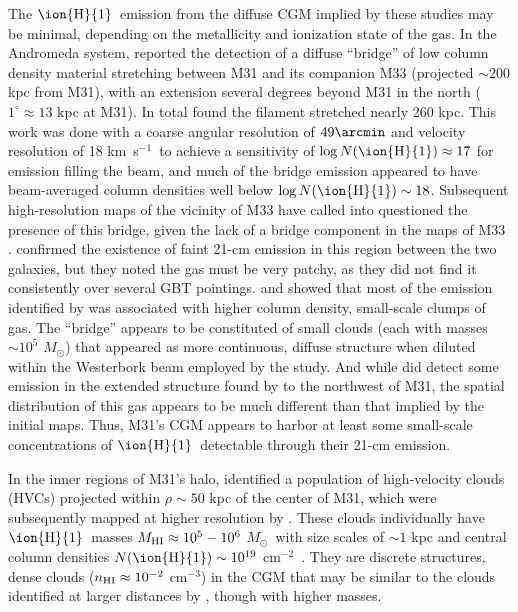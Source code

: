 \documentclass[12pt,preprint]{aastex6}
\newcommand{\HI}{\ensuremath{\mbox{\ion{H}{1}}}}
\newcommand{\NHI}{\ensuremath{N(\mbox{\ion{H}{1}})}\relax}
\newcommand{\logNHI}{\ensuremath{\log N(\mbox{\ion{H}{1}})}\relax}
\newcommand{\msun}{\ensuremath{M_\odot}\relax}
\newcommand{\column}{cm$^{-2}$}
\newcommand{\percc}{cm$^{-3}$}
\newcommand{\kms}{km~s$^{-1}$}
\begin{document}
The \HI\ emission from the diffuse CGM implied by these studies may be
minimal, depending on the metallicity and ionization state of the
gas. In the Andromeda system, \citet{braun2004} reported the detection
of a diffuse ``bridge'' of low column density material stretching
between M31 and its companion M33 (projected $\sim200$ kpc from M31),
with an extension several degrees beyond M31 in the north
($1^\circ \approx 13$ kpc at M31). In total \citeauthor{braun2004}
found the filament stretched nearly 260 kpc.  This work was done with
a coarse angular resolution of $49\arcmin$ and velocity resolution of
18 \kms\ to achieve a sensitivity of $\logNHI \approx 17$ for emission
filling the beam, and much of the bridge emission appeared to have
beam-averaged column densities well below $\logNHI \sim
18$. Subsequent high-resolution maps of the vicinity of M33 have
called into questioned the presence of this bridge, given the lack of
a bridge component in the maps of M33
\citep{putman2009}. \citet{lockman2012} confirmed the existence of
faint 21-cm emission in this region between the two galaxies, but they
noted the gas must be very patchy, as they did not find it
consistently over several GBT pointings. \citet{wolfe2013} and
\citet{wolfe2016} showed that most of the emission identified by
\citet{braun2004} was associated with higher column density,
small-scale clumps of gas. The ``bridge'' appears to be constituted of
small clouds (each with masses $\sim10^5$ \msun) that appeared as more
continuous, diffuse structure when diluted within the Westerbork beam
employed by the \citeauthor{braun2004} study.  And while
\citet{wolfe2016} did detect some emission in the extended structure
found by \citet{braun2004} to the northwest of M31, the spatial
distribution of this gas appears to be much different than that
implied by the initial maps. Thus, M31's CGM appears to harbor at
least some small-scale concentrations of \HI\ detectable through their
21-cm emission.

In the inner regions of M31's halo, \citet{thilker2004} identified a
population of high-velocity clouds (HVCs) projected within
$\rho \sim 50$ kpc of the center of M31, which were subsequently
mapped at higher resolution by \citet{westmeier2005}. These clouds
individually have \HI\ masses $M_{\rm HI} \approx 10^5 - 10^6$ \msun\
with size scales of $\sim1$ kpc and central column densities
$\NHI \sim10^{19}$ \column\ \citep{westmeier2005}. They are discrete
structures, dense clouds ($n_{\rm HI} \approx 10^{-2}$ \percc) in the
CGM that may be similar to the clouds identified at larger distances
by \citet{wolfe2016}, though with higher masses.
\end{document}
